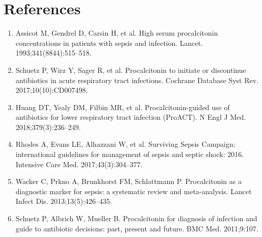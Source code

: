 \section*{References}
\begin{enumerate}
  \item Assicot M, Gendrel D, Carsin H, et al. High serum procalcitonin concentrations in patients with sepsis and infection. Lancet. 1993;341(8844):515--518.
  \item Schuetz P, Wirz Y, Sager R, et al. Procalcitonin to initiate or discontinue antibiotics in acute respiratory tract infections. Cochrane Database Syst Rev. 2017;10(10):CD007498.
  \item Huang DT, Yealy DM, Filbin MR, et al. Procalcitonin-guided use of antibiotics for lower respiratory tract infection (ProACT). N Engl J Med. 2018;379(3):236--249.
  \item Rhodes A, Evans LE, Alhazzani W, et al. Surviving Sepsis Campaign: international guidelines for management of sepsis and septic shock: 2016. Intensive Care Med. 2017;43(3):304--377.
  \item Wacker C, Prkno A, Brunkhorst FM, Schlattmann P. Procalcitonin as a diagnostic marker for sepsis: a systematic review and meta-analysis. Lancet Infect Dis. 2013;13(5):426--435.
  \item Schuetz P, Albrich W, Mueller B. Procalcitonin for diagnosis of infection and guide to antibiotic decisions: past, present and future. BMC Med. 2011;9:107.
\end{enumerate}

\clearpage

